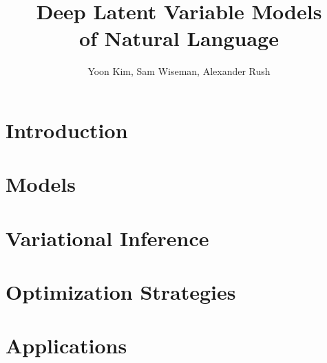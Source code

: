 \documentclass[aspectratio=169]{beamer}
\title[Tutorial: \\ Deep Latent NLP]{Deep Latent Variable Models  \\ of Natural Language}
\author[]{Yoon Kim, Sam Wiseman, Alexander Rush}
\institute[Harvard SEAS]{ 
  \begin{center}
    \texttt{[image: harvardnlp]}
  \end{center}
  \vspace{0.5cm}
  { \Large Tutorial 2018}
}
\date{}
\begin{document}
\begin{frame}
  \titlepage
\end{frame}

\section{Introduction}

%

\section{Models}
%

\section{Variational Inference}
%

\section{Optimization Strategies}
% 
% 
% 

\section{Applications}




\footnotesize


\end{document}
